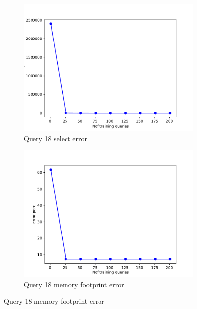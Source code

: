 \begin{figure}[!htb]
     \begin{subfigure}[t]{0.5\textwidth}
       \includegraphics[scale=0.4]{figs/tpch10/tpch10_sel18_error.pdf}
       \caption{Query 18 select error}
       \label{fig:tpch_sel18}
      \end{subfigure}
      \begin{subfigure}[t]{0.5\textwidth}
        \includegraphics[scale=0.4]{figs/tpch10/tpch10_q18_memerror.pdf}
        \caption{Query 18 memory footprint error}
        \label{fig:tpch_mem18}
      \end{subfigure}
\end{figure}

